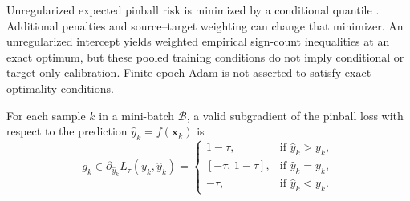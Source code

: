\documentclass[a4paper]{cas-sc}
\begin{document}
{\color{blue}Unregularized expected pinball risk is minimized by a conditional quantile \citep{takeuchi2006nonparametric}. Additional penalties and source--target weighting can change that minimizer. An unregularized intercept yields weighted empirical sign-count inequalities at an exact optimum, but these pooled training conditions do not imply conditional or target-only calibration. Finite-epoch Adam is not asserted to satisfy exact optimality conditions.}


For each sample $k$ in a mini-batch $\mathcal{B}$, a valid subgradient of the pinball loss with respect to the prediction $\hat{y}_k = f(\boldsymbol{x}_k)$ is
\begin{equation}
\label{eq:subgradient}
g_k \in \partial_{\hat{y}_k} L_{\tau}(y_k, \hat{y}_k)= \begin{cases}
    1-\tau, & \text{if } \hat{y}_k > y_k, \\
    [-\tau,\, 1-\tau], & \text{if } \hat{y}_k = y_k, \\
    -\tau, & \text{if } \hat{y}_k < y_k.
\end{cases}
\end{equation}
\end{document}
